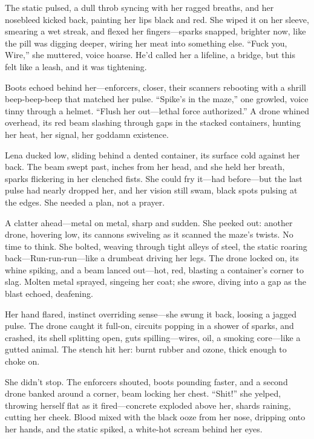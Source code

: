 \documentclass[12pt]{book}
\begin{document}
The static pulsed, a dull throb syncing with her ragged breaths, and her nosebleed kicked back, painting her lips black and red. She wiped it on her sleeve, smearing a wet streak, and flexed her fingers---sparks snapped, brighter now, like the pill was digging deeper, wiring her meat into something else. ``Fuck you, Wire,'' she muttered, voice hoarse. He’d called her a lifeline, a bridge, but this felt like a leash, and it was tightening.

Boots echoed behind her---enforcers, closer, their scanners rebooting with a shrill beep-beep-beep that matched her pulse. ``Spike’s in the maze,'' one growled, voice tinny through a helmet. ``Flush her out---lethal force authorized.'' A drone whined overhead, its red beam slashing through gaps in the stacked containers, hunting her heat, her signal, her goddamn existence.

Lena ducked low, sliding behind a dented container, its surface cold against her back. The beam swept past, inches from her head, and she held her breath, sparks flickering in her clenched fists. She could fry it---had before---but the last pulse had nearly dropped her, and her vision still swam, black spots pulsing at the edges. She needed a plan, not a prayer.

A clatter ahead---metal on metal, sharp and sudden. She peeked out: another drone, hovering low, its cannons swiveling as it scanned the maze’s twists. No time to think. She bolted, weaving through tight alleys of steel, the static roaring back---Run-run-run---like a drumbeat driving her legs. The drone locked on, its whine spiking, and a beam lanced out---hot, red, blasting a container’s corner to slag. Molten metal sprayed, singeing her coat; she swore, diving into a gap as the blast echoed, deafening.

Her hand flared, instinct overriding sense---she swung it back, loosing a jagged pulse. The drone caught it full-on, circuits popping in a shower of sparks, and crashed, its shell splitting open, guts spilling---wires, oil, a smoking core---like a gutted animal. The stench hit her: burnt rubber and ozone, thick enough to choke on.

She didn’t stop. The enforcers shouted, boots pounding faster, and a second drone banked around a corner, beam locking her chest. ``Shit!'' she yelped, throwing herself flat as it fired---concrete exploded above her, shards raining, cutting her cheek. Blood mixed with the black ooze from her nose, dripping onto her hands, and the static spiked, a white-hot scream behind her eyes.
\end{document}
